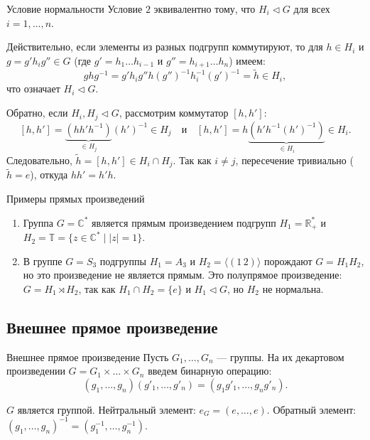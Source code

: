 \begin{Remark}{Условие нормальности}{}
	Условие $2$ эквивалентно тому, что $H_i \triangleleft G$ для всех $i = 1, \dots, n$.
	
	Действительно, если элементы из разных подгрупп коммутируют, то для $h \in H_i$ и $g = g' h_i g'' \in G$ (где $g' = h_1 \dots h_{i-1}$ и $g'' = h_{i+1} \dots h_n$) имеем:
	\[
	ghg^{-1} = g' h_i g'' h (g'')^{-1} h_i^{-1} (g')^{-1} = \widetilde{h} \in H_i,
	\]
	что означает $H_i \triangleleft G$.
	
	Обратно, если $H_i, H_j \triangleleft G$, рассмотрим коммутатор $[h, h']$:
	\[
	[h, h'] = \underbrace{(h h' h^{-1})}_{\in H_j} (h')^{-1} \in H_j \quad \text{и} \quad [h, h'] = h \underbrace{(h' h^{-1} (h')^{-1})}_{\in H_i} \in H_i.
	\]
	Следовательно, $\widetilde{h} = [h, h'] \in H_i \cap H_j$. Так как $i \neq j$, пересечение тривиально ($\widetilde{h} = e$), откуда $hh' = h'h$.
\end{Remark}

\begin{Example}{Примеры прямых произведений}{}
	\begin{enumerate}
		\item Группа $G = \mathbb{C}^*$ является прямым произведением подгрупп $H_1 = \mathbb{R}^*_+$ и $H_2 = \mathbb{T} = \{ z \in \mathbb{C}^* \mid |z| = 1 \}$.
		\item В группе $G = S_3$ подгруппы $H_1 = A_3$ и $H_2 = \langle(1\,2)\rangle$ порождают $G = H_1 H_2$, но это произведение не является прямым. Это полупрямое произведение: $G = H_1 \rtimes H_2$, так как $H_1 \cap H_2 = \{e\}$ и $H_1 \triangleleft G$, но $H_2$ не нормальна.
	\end{enumerate}
\end{Example}

\subsection{Внешнее прямое произведение}

\begin{Definition}{Внешнее прямое произведение}{}
	Пусть $G_1, \dots, G_n$ --- группы. На их декартовом произведении $G = G_1 \times \dots \times G_n$ введем бинарную операцию:
	\[
	(g_1, \dots, g_n)(g'_1, \dots, g'_n) = (g_1 g'_1, \dots, g_n g'_n).
	\]
\end{Definition}

\begin{Statement}{}{}
	$G$ является группой. Нейтральный элемент: $e_G = (e, \dots, e)$. Обратный элемент: $(g_1, \dots, g_n)^{-1} = (g_1^{-1}, \dots, g_n^{-1})$.
\end{Statement}

